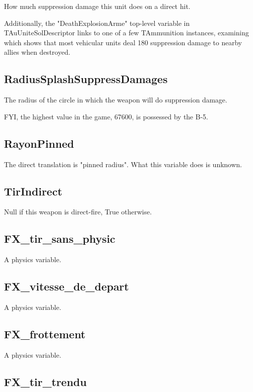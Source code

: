 \documentclass{article}
\begin{document}
How much suppression damage this unit does on a direct hit.

Additionally, the "DeathExplosionArme" top-level variable in TAuUniteSolDescriptor links to one of a few TAmmunition instances, examining which shows that most vehicular units deal 180 suppression damage to nearby allies when destroyed.

\subsection{RadiusSplashSuppressDamages}

The radius of the circle in which the weapon will do suppression damage.

FYI, the highest value in the game, 67600, is possessed by the B-5.

\subsection{RayonPinned}

The direct translation is "pinned radius". What this variable does is unknown.

\subsection{TirIndirect}

Null if this weapon is direct-fire, True otherwise.


\subsection{FX\_tir\_sans\_physic}

A physics variable.

\subsection{FX\_vitesse\_de\_depart}

A physics variable.

\subsection{FX\_frottement}

A physics variable.

\subsection{FX\_tir\_trendu}
\end{document}
